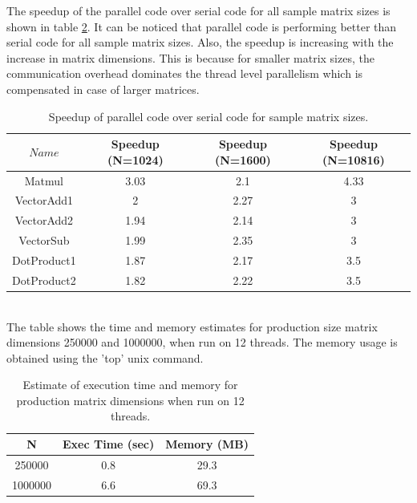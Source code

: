 \documentclass{article}
\begin{document}
\begin{spacing}{1.1}
The speedup of the parallel code over serial code for all sample matrix sizes is shown in table \ref{compspedup}. It can be noticed that parallel code is performing better than serial code for all sample matrix sizes. Also, the speedup is increasing with the increase in matrix dimensions. This is because for smaller matrix sizes, the communication overhead dominates the thread level parallelism which is compensated in case of larger matrices.
\begin{table}[H]
\begin{center}
 \begin{tabular}{| c | c|c|c|} 
 \hline
$Name$ & Speedup (N=1024) & Speedup (N=1600) & Speedup (N=10816)    \\ %
 \hline
Matmul & 3.03 &  2.1 & 4.33 \\ %
VectorAdd1 &  2  &2.27   & 3 \\ %
VectorAdd2 &  1.94 &  2.14 &3 \\ %
VectorSub &  1.99 &  2.35 & 3\\ %
DotProduct1 &  1.87 &  2.17 &3.5 \\ %
DotProduct2 &  1.82 &  2.22 & 3.5\\ %
 \hline
\end{tabular}%
\end{center}
\caption{\label{compspedup} Speedup of parallel code over serial code for sample matrix sizes.} 
\end{table}
\\
The table shows the time and memory estimates for production size matrix dimensions 250000 and 1000000, when run on 12 threads. The memory usage is obtained using the 'top' unix command.
\begin{table}[H]
\begin{center}
 \begin{tabular}{| c | c|c|} 
 \hline
 N & Exec Time (sec) & Memory (MB)   \\ %
 \hline
250000 & 0.8 & 29.3 \\ %
1000000 & 6.6  & 69.3 \\ %

 \hline
\end{tabular}%
\end{center}
\caption{\label{compspedup} Estimate of execution time and memory for production matrix dimensions when run on 12 threads.} 
\end{table}


\end{spacing}
\end{document}
